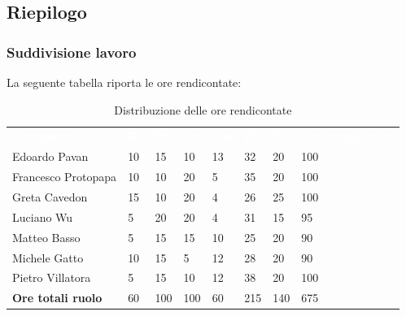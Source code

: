 \subsection{Riepilogo}
\subsubsection{Suddivisione lavoro}
La seguente tabella riporta le ore rendicontate: 
\begin{table}[H]
\begin{center}
\renewcommand{\arraystretch}{1.25}
\begin{tabular}{ m{}<{\centering}  m{}<{\centering} m{}<{\centering} m{}<{\centering}  m{}<{\centering}  m{}<{\centering}  m{}<{\centering}  m{}<{\centering}   }
	\rowcolor{darkblue}
	\textcolor{white}{\textbf{Componente}} &\textcolor{white}{\textbf{Re}}&\textcolor{white}{\textbf{Pt}}&\textcolor{white}{\textbf{An}}&\textcolor{white}{\textbf{Am}}&\textcolor{white}{\textbf{Pr}}&\textcolor{white}{\textbf{Ve}}&\textcolor{white}{\textbf{Ore complessive}}\\ 
	Edoardo Pavan & 10 & 15 & 10 & 13 & 32 & 20 & 100 \\	
	
	Francesco Protopapa & 10 & 10 & 20 & 5 & 35 & 20 & 100 \\

	Greta Cavedon & 15 & 10 & 20 & 4 & 26 & 25 & 100 \\
	
	Luciano Wu & 5 & 20 & 20 & 4 & 31 & 15 & 95 \\
	
	Matteo Basso & 5 & 15 & 15 & 10 & 25 & 20 & 90 \\
	
	Michele Gatto & 10 & 15 & 5 & 12 & 28 & 20 & 90 \\
	
	Pietro Villatora & 5 & 15 & 10 & 12 & 38 & 20 & 100 \\
	
	\textbf{Ore totali ruolo} & 60 & 100 & 100 & 60 & 215 & 140 & 675 \\

\end{tabular}
\caption{Distribuzione delle ore rendicontate}
\end{center}
\end{table}

